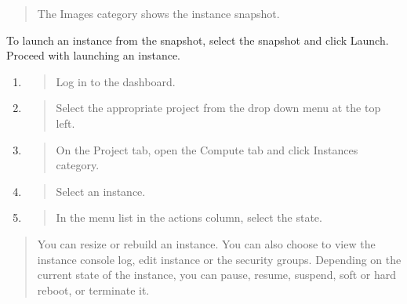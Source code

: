 \begin{quote}
The Images category shows the instance snapshot.
\end{quote}

To launch an instance from the snapshot, select the snapshot and click
Launch. Proceed with launching an instance.

\label{manage-an-instance}

\begin{enumerate}
\def\labelenumi{\arabic{enumi}.}
\item
  \begin{quote}
  Log in to the dashboard.
  \end{quote}
\item
  \begin{quote}
  Select the appropriate project from the drop down menu at the top
  left.
  \end{quote}
\item
  \begin{quote}
  On the Project tab, open the Compute tab and click Instances category.
  \end{quote}
\item
  \begin{quote}
  Select an instance.
  \end{quote}
\item
  \begin{quote}
  In the menu list in the actions column, select the state.
  \end{quote}
\end{enumerate}

\begin{quote}
You can resize or rebuild an instance. You can also choose to view the
instance console log, edit instance or the security groups. Depending on
the current state of the instance, you can pause, resume, suspend, soft
or hard reboot, or terminate it.
\end{quote}
